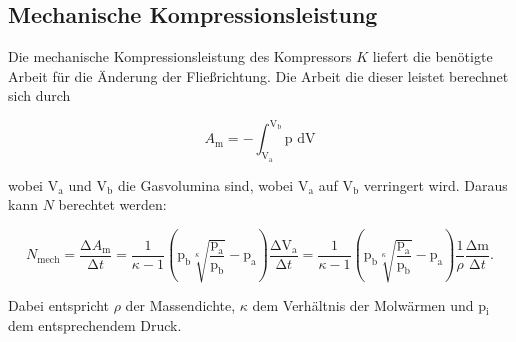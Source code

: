 \subsection{Mechanische Kompressionsleistung}

Die mechanische Kompressionsleistung des Kompressors $K$ liefert die benötigte Arbeit für die Änderung der Fließrichtung.
Die Arbeit die dieser leistet berechnet sich durch

\begin{equation}
    A_{\text{m}} = - \int_{\text{V}_\text{a}}^{\text{V}_\text{b}} \text{p dV} 
\end{equation}

wobei $\text{V}_\text{a}$ und $\text{V}_\text{b}$ die Gasvolumina sind, wobei $\text{V}_\text{a}$ auf $\text{V}_\text{b}$ verringert wird.
Daraus kann $N$ berechtet werden: %

\begin{equation} \label{eq:n_mech}
    N_\text{mech} = \frac{\increment A_{\text{m}}} {\increment t}
    = \frac{1}{\kappa - 1} \left(\text{p}_\text{b} \sqrt[\kappa]{\frac{\text{p}_\text{a}}{\text{p}_\text{b}}
    } - \text{p}_\text{a} \right) \frac{\increment \text{V}_\text{a}}{\increment t}
    = \frac{1}{\kappa - 1} \left(\text{p}_\text{b} \sqrt[\kappa]{\frac{\text{p}_\text{a}}{\text{p}_\text{b}}
    } - \text{p}_\text{a} \right) \frac{1}{\rho} \frac{\increment \text{m}}{\increment t}.
\end{equation}

Dabei entspricht $\rho$ der Massendichte, $\kappa$ dem Verhältnis der Molwärmen und p$_\text{i}$ 
dem entsprechendem Druck.

